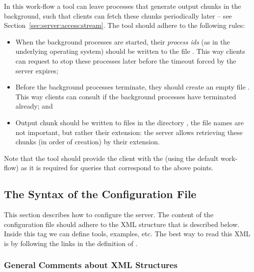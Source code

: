 In this work-flow a tool can leave processes that generate output
chunks in the background, such that clients can fetch these chunks
periodically later -- see Section~\ref{sec:server:access:stream}. The
tool should adhere to the following rules:
%
\begin{itemize}

\item When the background processes are started, their \emph{process
    ids} (as in the underlying operating system) should be written to
  the file
  . This
  way clients can request to stop these processes later before the
  timeout forced by the server expires;

\item Before the background processes terminate, they should create an
  empty file
  . This
  way clients can consult if the background processes have terminated
  already; and

\item Output chunk should be written to files in the directory
  , the file
  names are not important, but rather their extension: the server
  allows retrieving these chunks (in order of creation) by their
  extension.

\end{itemize}
%
Note that the tool should provide the client with the
 (using the default work-flow) as it is
required for queries that correspond to the above points.
%


\subsection{The Syntax of the Configuration File}
\label{sec:server:config:xml}

This section describes how to configure the \ei server.
%
The content of the configuration file should adhere to the
 XML structure that is described below.
%
Inside this tag we can define tools, examples, etc. The best way to
read this XML is by following the links in the definition of
.

\subsubsection{General Comments about XML Structures} 


